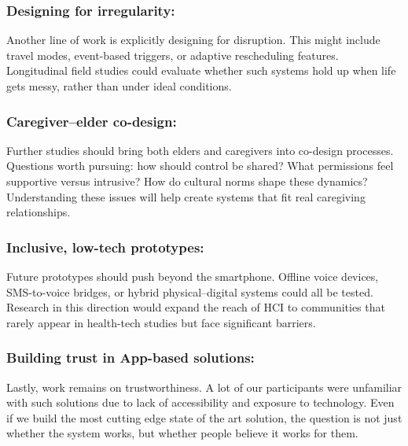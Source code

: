 \documentclass[acmlarge]{acmart}
\begin{document}
\subsubsection{Designing for irregularity: }
Another line of work is explicitly designing for disruption. This might
include travel modes, event-based triggers, or adaptive rescheduling
features. Longitudinal field studies could evaluate whether such systems
hold up when life gets messy, rather than under ideal conditions.


\subsubsection{Caregiver–elder co-design: }
Further studies should bring both elders and caregivers into co-design
processes. \cite{10.1145/3613904.3642595} Questions worth pursuing: how should
control be shared? What permissions feel supportive versus intrusive?
How do cultural norms shape these dynamics? Understanding these issues
will help create systems that fit real caregiving relationships.

\subsubsection{Inclusive, low-tech prototypes: }
Future prototypes should push beyond the smartphone. \cite{10.1145/3594739.3610764}
Offline voice devices, SMS-to-voice bridges, or hybrid physical--digital
systems could all be tested. Research in this direction would expand the
reach of HCI to communities that rarely appear in health-tech studies
but face significant barriers.

\subsubsection{Building trust in App-based solutions: }
Lastly, work remains on trustworthiness. A lot of our participants were
unfamiliar with such solutions due to lack of accessibility and exposure
to technology. Even if we build the most cutting edge state of the art
solution, the question is not just whether the system works, but whether
people believe it works for them. \cite{10.3389/fdgth.2025.1523070}
\end{document}
